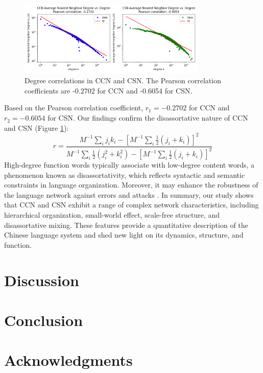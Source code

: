\documentclass[11pt]{article}
\begin{document}
\begin{figure}[htbp]
    \centering
    \includegraphics[width=0.8\textwidth]{../analysis/knn/knn.png}
    \caption{Degree correlations in CCN and CSN. The Pearson correlation coefficients are -0.2702 for CCN and -0.6054 for CSN.}
    \label{fig:degree_correlation}
    \end{figure}
    Based on the Pearson correlation coefficient, $r_1=-0.2702$ for CCN and $r_2=-0.6054$ for CSN. Our findings confirm the disassortative nature of CCN and CSN (Figure \ref{fig:degree_correlation}):
    \begin{equation}
    r = \frac{M^{-1}\sum_{i}j_ik_i-[M^{-1}\sum_{i}\frac{1}{2}(j_i+k_i)]^2}{M^{-1}\sum_{i}\frac{1}{2}(j_i^2+k_i^2)-[M^{-1}\sum_{i}\frac{1}{2}(j_i+k_i)]^2}
    \end{equation}
    High-degree function words typically associate with low-degree content words, a phenomenon known as disassortativity, which reflects syntactic and semantic constraints in language organization. Moreover, it may enhance the robustness of the language network against errors and attacks \cite{Newman, 2002}.
    In summary, our study shows that CCN and CSN exhibit a range of complex network characteristics, including hierarchical organization, small-world effect, scale-free structure, and disassortative mixing. These features provide a quantitative description of the Chinese language system and shed new light on its dynamics, structure, and function. 
\section{Discussion}

\section{Conclusion}

\section*{Acknowledgments}
\end{document}
